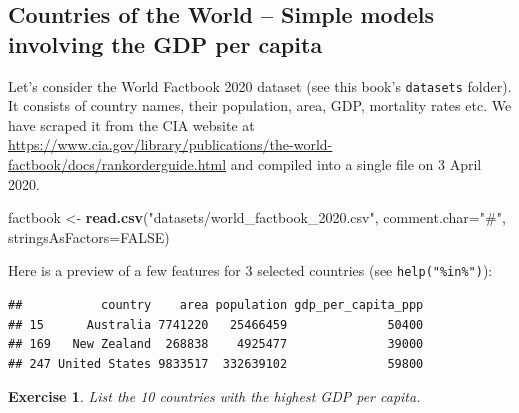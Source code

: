 \documentclass[10pt,b5paper,krantz1]{krantz}
\newenvironment{Shaded}{\begin{snugshade}}{\end{snugshade}}
\newcommand{\DataTypeTok}[1]{\textcolor[rgb]{0.27,0.27,0.27}{#1}}
\newcommand{\KeywordTok}[1]{\textcolor[rgb]{0.27,0.27,0.27}{\textbf{#1}}}
\newcommand{\NormalTok}[1]{#1}
\newcommand{\OperatorTok}[1]{\textcolor[rgb]{0.43,0.43,0.43}{\textbf{#1}}}
\newcommand{\OtherTok}[1]{\textcolor[rgb]{0.37,0.37,0.37}{#1}}
\newcommand{\StringTok}[1]{\textcolor[rgb]{0.5,0.5,0.5}{#1}}
\newtheorem{exercise}{Exercise}[chapter]
\begin{document}
\hypertarget{countries-of-the-world-simple-models-involving-the-gdp-per-capita}{%
\subsection{Countries of the World -- Simple models involving the GDP per capita}\label{countries-of-the-world-simple-models-involving-the-gdp-per-capita}}

Let's consider the World Factbook 2020 dataset
(see this book's \texttt{datasets} folder).
It consists of country names, their population,
area, GDP, mortality rates etc. We have scraped it from the CIA website
at \url{https://www.cia.gov/library/publications/the-world-factbook/docs/rankorderguide.html}
and compiled into a single file on 3 April 2020.

\begin{Shaded}
\begin{Highlighting}[]
\NormalTok{factbook <-}\StringTok{ }\KeywordTok{read.csv}\NormalTok{(}\StringTok{"datasets/world_factbook_2020.csv"}\NormalTok{,}
    \DataTypeTok{comment.char=}\StringTok{"#"}\NormalTok{, }\DataTypeTok{stringsAsFactors=}\OtherTok{FALSE}\NormalTok{)}
\end{Highlighting}
\end{Shaded}

Here is a preview of a few features for 3 selected countries (see \texttt{help("\%in\%")}):

\begin{Shaded}
\end{Shaded}

\begin{verbatim}
##           country    area population gdp_per_capita_ppp
## 15      Australia 7741220   25466459              50400
## 169   New Zealand  268838    4925477              39000
## 247 United States 9833517  332639102              59800
\end{verbatim}

\begin{exercise}

List the 10 countries with the highest GDP per capita.

\end{exercise}
\end{document}

